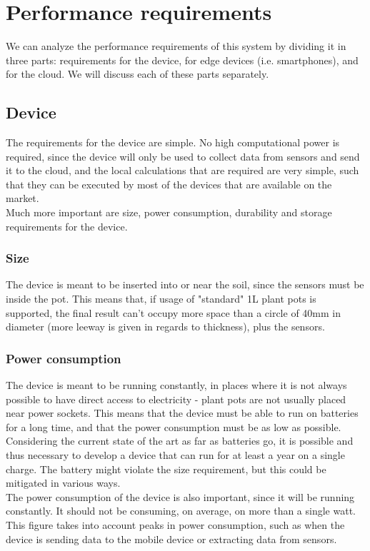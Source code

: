 \section{Performance requirements}
We can analyze the performance requirements of this system by dividing it in three
parts: requirements for the device, for edge devices (i.e. smartphones), and for
the cloud. We will discuss each of these parts separately.

\subsection{Device}
The requirements for the device are simple. No high computational power is required,
since the device will only be used to collect data from sensors and send it to the
cloud, and the local calculations that are required are very simple, such that
they can be executed by most of the devices that are available on the market. \\
Much more important are size, power consumption, durability and storage requirements
for the device.

\subsubsection{Size}
The device is meant to be inserted into or near the soil, since
the sensors must be inside the pot. This means that, if usage of "standard" 1L plant
pots is supported, the final result can't occupy more space than a circle of 40mm
in diameter (more leeway is given in regards to thickness), plus the sensors.

\subsubsection{Power consumption}
The device is meant to be running constantly, in places where it is not always possible
to have direct access to electricity - plant pots are not usually placed near power
sockets. This means that the device must be able to run on batteries for a long time,
and that the power consumption must be as low as possible. \\
Considering the current state of the art as far as batteries go, it is possible
and thus necessary to develop a device that can run for at least a year on a single
charge. The battery might violate the size requirement, but this could be mitigated
in various ways. \\
The power consumption of the device is also important, since it will be running
constantly. It should not be consuming, on average, on more than a single watt.
This figure takes into account peaks in power consumption, such as when the device
is sending data to the mobile device or extracting data from sensors.

